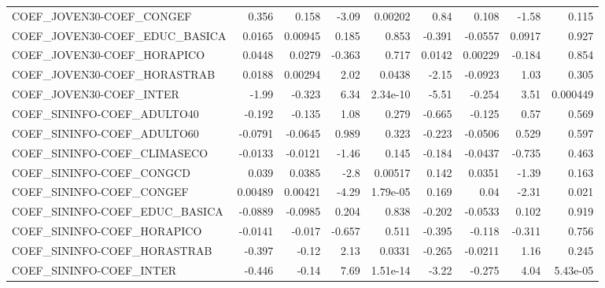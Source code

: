 \begin{tabular}{lrrrrrrrr}
COEF\_JOVEN30-COEF\_CONGEF              &       0.356 &        0.158 &   -3.09 &  0.00202 &       0.84 &       0.108 &        -1.58 &         0.115 \\
COEF\_JOVEN30-COEF\_EDUC\_BASICA         &      0.0165 &      0.00945 &   0.185 &    0.853 &     -0.391 &     -0.0557 &       0.0917 &         0.927 \\
COEF\_JOVEN30-COEF\_HORAPICO            &      0.0448 &       0.0279 &  -0.363 &    0.717 &     0.0142 &     0.00229 &       -0.184 &         0.854 \\
COEF\_JOVEN30-COEF\_HORASTRAB           &      0.0188 &      0.00294 &    2.02 &   0.0438 &      -2.15 &     -0.0923 &         1.03 &         0.305 \\
COEF\_JOVEN30-COEF\_INTER               &       -1.99 &       -0.323 &    6.34 & 2.34e-10 &      -5.51 &      -0.254 &         3.51 &      0.000449 \\
COEF\_SININFO-COEF\_ADULTO40            &      -0.192 &       -0.135 &    1.08 &    0.279 &     -0.665 &      -0.125 &         0.57 &         0.569 \\
COEF\_SININFO-COEF\_ADULTO60            &     -0.0791 &      -0.0645 &   0.989 &    0.323 &     -0.223 &     -0.0506 &        0.529 &         0.597 \\
COEF\_SININFO-COEF\_CLIMASECO           &     -0.0133 &      -0.0121 &   -1.46 &    0.145 &     -0.184 &     -0.0437 &       -0.735 &         0.463 \\
COEF\_SININFO-COEF\_CONGCD              &       0.039 &       0.0385 &    -2.8 &  0.00517 &      0.142 &      0.0351 &        -1.39 &         0.163 \\
COEF\_SININFO-COEF\_CONGEF              &     0.00489 &      0.00421 &   -4.29 & 1.79e-05 &      0.169 &        0.04 &        -2.31 &         0.021 \\
COEF\_SININFO-COEF\_EDUC\_BASICA         &     -0.0889 &      -0.0985 &   0.204 &    0.838 &     -0.202 &     -0.0533 &        0.102 &         0.919 \\
COEF\_SININFO-COEF\_HORAPICO            &     -0.0141 &       -0.017 &  -0.657 &    0.511 &     -0.395 &      -0.118 &       -0.311 &         0.756 \\
COEF\_SININFO-COEF\_HORASTRAB           &      -0.397 &        -0.12 &    2.13 &   0.0331 &     -0.265 &     -0.0211 &         1.16 &         0.245 \\
COEF\_SININFO-COEF\_INTER               &      -0.446 &        -0.14 &    7.69 & 1.51e-14 &      -3.22 &      -0.275 &         4.04 &      5.43e-05 \\

\end{tabular}
